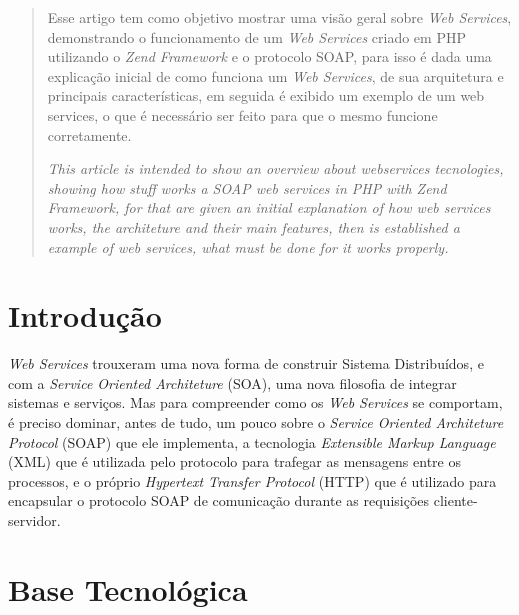 \documentclass{acm_proc_article-sp}
\begin{document}
\maketitle
\begin{abstract}
		Esse artigo tem como objetivo mostrar uma visão geral sobre \emph{Web Services}, demonstrando o funcionamento de um \emph{Web Services} criado em PHP utilizando o \emph{Zend Framework} e o protocolo SOAP, para isso é dada uma explicação inicial de como funciona um \emph{Web Services}, de sua arquitetura e principais características, em seguida é exibido um exemplo de um web services, o que é necessário ser feito para que o mesmo funcione corretamente.
		
		
		\emph{This article is intended to show an overview about webservices tecnologies, showing how stuff works a SOAP web services in PHP with Zend Framework, for that are given an initial explanation of how web services works, the architeture and their main features, then is established a example of  web services, what must be done for it works properly.}
			
\end{abstract}





\section{Introdução}
		\emph{Web Services} trouxeram uma nova forma de construir Sistema Distribuídos, e com a \emph{Service Oriented Architeture} (SOA), uma nova filosofia de integrar sistemas e serviços. Mas para compreender como os \emph{Web Services} se comportam, é preciso dominar, antes de tudo, um pouco sobre o \emph{Service Oriented Architeture Protocol} (SOAP) que ele implementa, a tecnologia \emph{Extensible Markup Language} (XML) que é utilizada pelo protocolo para trafegar as mensagens entre os processos, e o próprio \emph{Hypertext Transfer Protocol} (HTTP) que é utilizado para encapsular o protocolo SOAP de comunicação durante as requisições cliente-servidor.
		
		
\section{Base Tecnológica}
		
\end{document}
